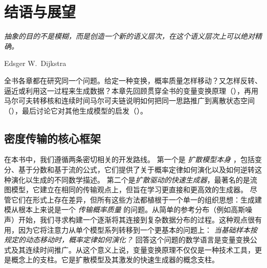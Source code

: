 \chapter{结语与展望}\label{ch:epilogue}

\epigraph{\textit{抽象的目的不是模糊，而是创造一个新的语义层次，在这个语义层次上可以绝对精确。}}{Edsger W.\ Dijkstra}

全书各章都在研究同一个问题。给定一种变换，概率质量怎样移动？又怎样反转、逼近或利用这一过程来生成数据？本章先回顾贯穿全书的变量变换原理（），再用马尔可夫转移核和连续时间马尔可夫链说明如何把同一思路推广到离散状态空间（），最后讨论它对其他生成模型的启发（）。




\section{密度传输的核心框架}\label{sec:epilogue-backbone}

在本书中，我们遵循两条密切相关的开发路线。
第一个是 \emph{ 扩散模型本身 }，包括变分、基于分数和基于流的公式，它们提供了关于概率定律如何演化以及如何逆转这种演化以生成的不同数学描述。
第二个是\emph{扩散驱动的快速生成器}，最著名的是流图模型，它建立在相同的传输观点上，但旨在学习更直接和更高效的生成器。
尽管它们在形式上存在差异，但所有这些方法都植根于一个单一的组织思想：生成建模从根本上来说是一个 \emph{ 传输概率质量 } 的问题。从简单的参考分布（例如高斯噪声）开始，我们寻求构建一个逐渐将其连接到复杂数据分布的过程。这种观点很有用，因为它将注意力从单个模型系列转移到一个更基本的问题上：
\emph{当基础样本按规定的动态移动时，概率定律如何演化？}
回答这个问题的数学语言是变量变换公式及其连续时间推广。从这个意义上说，变量变换原理不仅仅是一种技术工具，更是概念上的支柱。它是扩散模型及其激发的快速生成器的概念支柱。

